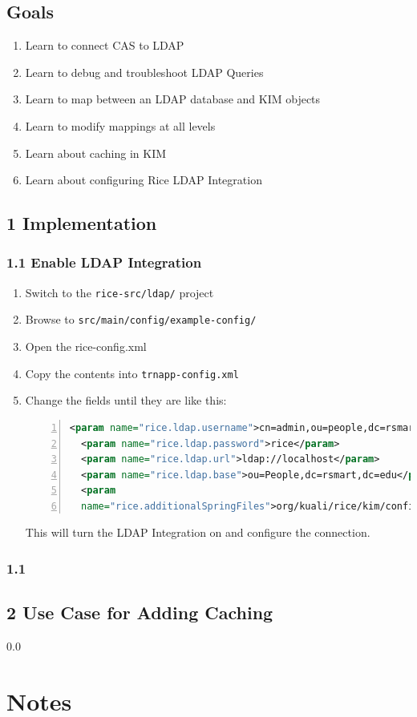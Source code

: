 \subsection*{Goals}
\begin{enumerate}
  \item Learn to connect CAS to LDAP
  \item Learn to debug and troubleshoot LDAP Queries
  \item Learn to map between an LDAP database and KIM objects
  \item Learn to modify mappings at all levels
  \item Learn about caching in KIM
  \item Learn about configuring Rice LDAP Integration
\end{enumerate}

\subsection*{1 Implementation}
\subsubsection*{1.1 Enable LDAP Integration}
\begin{enumerate}
\item Switch to the \verb|rice-src/ldap/| project
\item Browse to \verb|src/main/config/example-config/|
\item Open the rice-config.xml
\item Copy the contents into \verb|trnapp-config.xml|
\item Change the fields until they are like this:
\begin{lstlisting}[numbers=left,language=xml,basicstyle=\scriptsize,backgroundcolor=\color{ubergray},caption={trnapp-config.xml},frame=single,breaklines=true]
  <param name="rice.ldap.username">cn=admin,ou=people,dc=rsmart,dc=com</param>
  <param name="rice.ldap.password">rice</param>
  <param name="rice.ldap.url">ldap://localhost</param>
  <param name="rice.ldap.base">ou=People,dc=rsmart,dc=edu</param>
  <param
  name="rice.additionalSpringFiles">org/kuali/rice/kim/config/KIMLdapSpringBeans.xml</param>
\end{lstlisting}
This will turn the LDAP Integration on and configure the connection.
\end{enumerate}

\subsubsection*{1.1}

\subsection*{2 Use Case for Adding Caching}

\newpage
{\setlength{\baselineskip}%
  {0.0\baselineskip}
  \section*{Notes}
  \hrulefill \par}